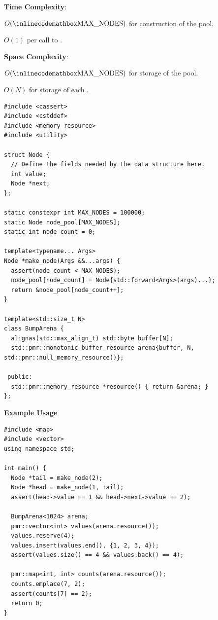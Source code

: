 \textbf{Time Complexity}:
\begin{compactitem}
  \item $O({\inlinecodemath{MAX\_NODES}})$ for construction of the pool.
  \item $O(1)$ per call to .
\end{compactitem}

\textbf{Space Complexity}:
\begin{compactitem}
  \item $O({\inlinecodemath{MAX\_NODES}})$ for storage of the pool.
  \item $O(N)$ for storage of each .
\end{compactitem}

\begin{lstlisting}[style=cpp]
#include <cassert>
#include <cstddef>
#include <memory_resource>
#include <utility>

struct Node {
  // Define the fields needed by the data structure here.
  int value;
  Node *next;
};

static constexpr int MAX_NODES = 100000;
static Node node_pool[MAX_NODES];
static int node_count = 0;

template<typename... Args>
Node *make_node(Args &&...args) {
  assert(node_count < MAX_NODES);
  node_pool[node_count] = Node{std::forward<Args>(args)...};
  return &node_pool[node_count++];
}

template<std::size_t N>
class BumpArena {
  alignas(std::max_align_t) std::byte buffer[N];
  std::pmr::monotonic_buffer_resource arena{buffer, N, std::pmr::null_memory_resource()};

 public:
  std::pmr::memory_resource *resource() { return &arena; }
};
\end{lstlisting}
\textbf{Example Usage}\par
\begin{lstlisting}[style=cpp]
#include <map>
#include <vector>
using namespace std;

int main() {
  Node *tail = make_node(2);
  Node *head = make_node(1, tail);
  assert(head->value == 1 && head->next->value == 2);

  BumpArena<1024> arena;
  pmr::vector<int> values(arena.resource());
  values.reserve(4);
  values.insert(values.end(), {1, 2, 3, 4});
  assert(values.size() == 4 && values.back() == 4);

  pmr::map<int, int> counts(arena.resource());
  counts.emplace(7, 2);
  assert(counts[7] == 2);
  return 0;
}
\end{lstlisting}
